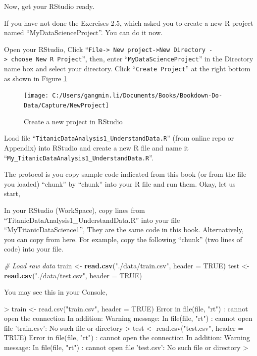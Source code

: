 \documentclass[
]{book}
\newenvironment{Shaded}{\begin{snugshade}}{\end{snugshade}}
\newcommand{\CommentTok}[1]{\textcolor[rgb]{0.56,0.35,0.01}{\textit{#1}}}
\newcommand{\DataTypeTok}[1]{\textcolor[rgb]{0.13,0.29,0.53}{#1}}
\newcommand{\KeywordTok}[1]{\textcolor[rgb]{0.13,0.29,0.53}{\textbf{#1}}}
\newcommand{\NormalTok}[1]{#1}
\newcommand{\OtherTok}[1]{\textcolor[rgb]{0.56,0.35,0.01}{#1}}
\newcommand{\StringTok}[1]{\textcolor[rgb]{0.31,0.60,0.02}{#1}}
\begin{document}
Now, get your RStudio ready.

If you have not done the Exercises 2.5, which asked you to create a new R project named ``MyDataScienceProject''. You can do it now.

Open your RStudio, Click ``\texttt{File-\textgreater{}\ New\ project-\textgreater{}New\ Directory\ -\textgreater{}\ choose\ New\ R\ Project}'', then, enter ``\texttt{MyDataScienceProject}'' in the Directory name box and select your directory. Click ``\texttt{Create\ Project}'' at the right bottom as shown in Figure \ref{fig:newproject}

\begin{figure}

{\centering \texttt{[image: C:/Users/gangmin.li/Documents/Books/Bookdown-Do-Data/Capture/NewProject]} 

}

\caption{Create a new project in RStudio }\label{fig:newproject}
\end{figure}

Load file ``\texttt{TitanicDataAnalysis1\_UnderstandData.R}'' (from online repo or Appendix) into RStudio and create a new R file and name it ``\texttt{My\_TitanicDataAnalysis1\_UnderstandData.R}''.

The protocol is you copy sample code indicated from this book (or from the file you loaded) ``chunk'' by ``chunk'' into your R file and run them. Okay, let us start,

In your RStudio (WorkSpace), copy lines from ``TitanicDataAnalysis1\_UnderstandData.R'' into your file ``MyTitanicDataScience1'', They are the same code in this book. Alternatively, you can copy from here. For example, copy the following ``chunk'' (two lines of code) into your file.

\begin{Shaded}
\begin{Highlighting}[]
\CommentTok{# Load raw data}
\NormalTok{train <-}\StringTok{ }\KeywordTok{read.csv}\NormalTok{(}\StringTok{"./data/train.csv"}\NormalTok{, }\DataTypeTok{header =} \OtherTok{TRUE}\NormalTok{)}
\NormalTok{test <-}\StringTok{ }\KeywordTok{read.csv}\NormalTok{(}\StringTok{"./data/test.csv"}\NormalTok{, }\DataTypeTok{header =} \OtherTok{TRUE}\NormalTok{)}
\end{Highlighting}
\end{Shaded}

You may see this in your Console,

\begin{Shaded}
\begin{Highlighting}[]
\NormalTok{>}\DataTypeTok{ train <- read.csv("train.csv", header = TRUE)}
\DataTypeTok{Error in file(file, "rt") : cannot open the connection}
\DataTypeTok{In addition: Warning message:}
\DataTypeTok{In file(file, "rt") :}
\DataTypeTok{  cannot open file 'train.csv': No such file or directory}
\DataTypeTok{> test <- read.csv("test.csv", header = TRUE)}
\DataTypeTok{Error in file(file, "rt") : cannot open the connection}
\DataTypeTok{In addition: Warning message:}
\DataTypeTok{In file(file, "rt") :}
\DataTypeTok{  cannot open file 'test.csv': No such file or directory}
\DataTypeTok{> }
\end{Highlighting}
\end{Shaded}
\end{document}
